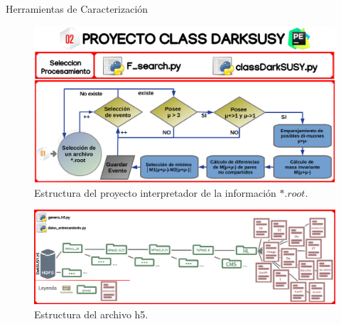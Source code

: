 \begin{frame}{Herramientas de Caracterización}
\begin{figure}[h]
\centering
\includegraphics[width=1\textwidth]{Imag/class_darksusy.png}
\caption{Estructura del proyecto interpretador de la información $*.root$.}
\end{figure}

\framebreak

\begin{figure}[h]
\centering
\includegraphics[width=1\textwidth]{Imag/class_darksusy3.png}
\caption{Estructura del archivo h5.}
\end{figure}
\end{frame}